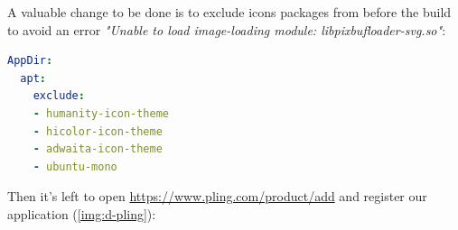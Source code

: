 \noindent A valuable change  to be done is to exclude icons packages from  before 
the build to avoid an error \emph{"Unable to load image-loading module: libpixbufloader-svg.so"}:

\begin{lstlisting}[language=yaml]
AppDir:
  apt:
    exclude:
    - humanity-icon-theme
    - hicolor-icon-theme
    - adwaita-icon-theme
    - ubuntu-mono
\end{lstlisting}

\noindent Then it's left to open \href{https://www.pling.com/product/add}{https://www.pling.com/product/add}
and register our application (\cref{img:d-pling}):

